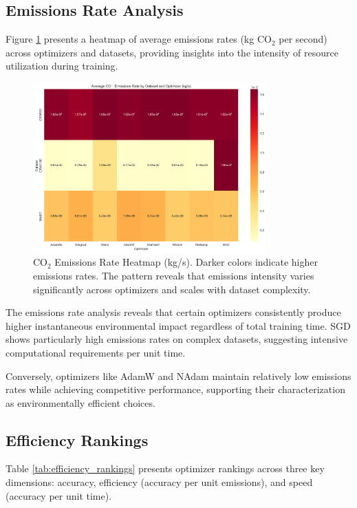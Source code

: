 \documentclass[conference]{IEEEtran}
\begin{document}
\subsection{Emissions Rate Analysis}

Figure \ref{fig:emissions_rate} presents a heatmap of average emissions rates (kg CO$_2$ per second) across optimizers and datasets, providing insights into the intensity of resource utilization during training.

\begin{figure}[htbp]
\centering
\includegraphics[width=0.8\textwidth]{../results/plots/emissions_rate_heatmap.png}
\caption{CO$_2$ Emissions Rate Heatmap (kg/s). Darker colors indicate higher emissions rates. The pattern reveals that emissions intensity varies significantly across optimizers and scales with dataset complexity.}
\label{fig:emissions_rate}
\end{figure}

The emissions rate analysis reveals that certain optimizers consistently produce higher instantaneous environmental impact regardless of total training time. SGD shows particularly high emissions rates on complex datasets, suggesting intensive computational requirements per unit time.

Conversely, optimizers like AdamW and NAdam maintain relatively low emissions rates while achieving competitive performance, supporting their characterization as environmentally efficient choices.


\subsection{Efficiency Rankings}

Table \ref{tab:efficiency_rankings} presents optimizer rankings across three key dimensions: accuracy, efficiency (accuracy per unit emissions), and speed (accuracy per unit time).
\end{document}
